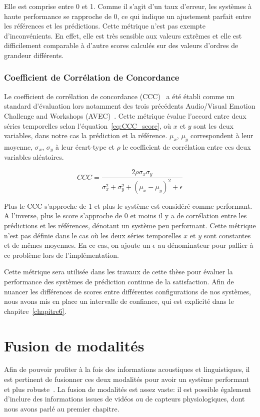 Elle est comprise entre 0 et 1. Comme il s'agit d'un taux d'erreur, les systèmes à haute performance se rapproche de 0, ce qui indique un ajustement parfait entre les références et les prédictions. Cette métrique n'est pas exempte d'inconvénients. En effet, elle est très sensible aux valeurs extrêmes et elle est difficilement comparable à d'autre scores calculés sur des valeurs d'ordres de grandeur différents.

\subsubsection{Coefficient de Corrélation de Concordance}
Le coefficient de corrélation de concordance (CCC)~\cite{CCC} a été établi comme un standard d'évaluation lors notamment des trois précédents Audio/Visual Emotion Challenge and Workshops (AVEC)~\cite{AVEC2017,AVEC2018,AVEC2019}. Cette métrique évalue l'accord entre deux séries temporelles selon l'équation~\ref{eq:CCC_score}, où $x$ et $y$ sont les deux variables, dans notre cas la prédiction et la référence. $\mu_x$, $\mu_y$ correspondent à leur moyenne, $\sigma_x$, $\sigma_y$ à leur écart-type et $\rho$ le coefficient de corrélation entre ces deux variables aléatoires.

 \begin{equation}
    CCC = \frac{2\rho\sigma_x\sigma_y}{\sigma_x^2 + \sigma_y^2 + (\mu_x - \mu_y)^2 + \epsilon}
 \label{eq:CCC_score}
 \end{equation}

Plus le CCC s'approche de 1 et plus le système est considéré comme performant. A l'inverse, plus le score s'approche de 0 et moins il y a de corrélation entre les prédictions et les références, dénotant un système peu performant.
Cette métrique n'est pas définie dans le cas où les deux séries temporelles $x$ et $y$ sont constantes et de mêmes moyennes. En ce cas, on ajoute un $\epsilon$ au dénominateur pour pallier à ce problème lors de l'implémentation.

Cette métrique sera utilisée dans les travaux de cette thèse pour évaluer la performance des systèmes de prédiction continue de la satisfaction. Afin de nuancer les différences de scores entre différentes configurations de nos systèmes, nous avons mis en place un intervalle de confiance, qui est explicité dans le chapitre~\ref{chapitre6}.

\section{Fusion de modalités}
Afin de pouvoir profiter à la fois des informations acoustiques et linguistiques, il est pertinent de fusionner ces deux modalités pour avoir un système performant et plus robuste~\cite{Wollmer2013,Alam2014,Atrey2010,Liu2018}. La fusion de modalités est assez vaste: il est possible également d'inclure des informations issues de vidéos ou de capteurs physiologiques, dont nous avons parlé au premier chapitre.

